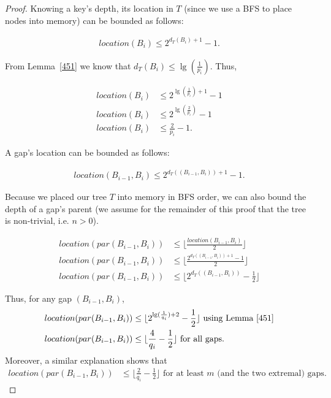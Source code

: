 \documentclass[letterpaper,12pt,titlepage,oneside,final]{book}
\theoremstyle{plain}
\begin{document}
\begin{proof}
Knowing a key's depth, its location in $T$ (since we use a BFS to place nodes into memory) can be bounded as follows:

\begin{align*}
location(B_i) \leq 2^{d_T(B_i)+1}-1.
\end{align*}

From Lemma~\ref{451} we know that $d_T(B_i) \leq \lg(\frac{1}{p_i})$. Thus,

\begin{align*}
location(B_i) &\leq 2^{\lg(\frac{1}{p_i})+1}-1 \\
location(B_i) &\leq 2^{\lg(\frac{2}{p_i})}-1 \\
location(B_i) &\leq \frac{2}{p_i}-1.
\end{align*}

A gap's location can be bounded as follows:

\begin{align*}
location(B_{i-1}, B_i) \leq 2^{d_T((B_{i-1},B_i))+1}-1.
\end{align*}

Because we placed our tree $T$ into memory in BFS order, we can also bound the depth of a gap's parent (we assume for the remainder of this proof that the tree is non-trivial, i.e. $n>0$).

\begin{align*}
location(par(B_{i-1}, B_i)) &\leq \lfloor \frac{location(B_{i-1}, B_i)}{2} \rfloor \\
location(par(B_{i-1}, B_i)) &\leq \lfloor \frac{2^{d_T((B_{i-1},B_i))+1}-1}{2} \rfloor \\
location(par(B_{i-1}, B_i)) &\leq \lfloor 2^{d_T((B_{i-1},B_i))}-\frac{1}{2} \rfloor
\end{align*}

Thus, for any gap $(B_{i-1},B_i)$,
\begin{align*}
location(par(B_{i-1},B_i)) &\leq \lfloor 2^{\lg(\frac{1}{q_i}) + 2}-\frac{1}{2} \rfloor \text{ using Lemma~\ref{451}} \\
location(par(B_{i-1},B_i)) &\leq \lfloor \frac{4}{q_i}-\frac{1}{2} \rfloor \text{ for all gaps.}
\end{align*}
Moreover, a similar explanation shows that 
\begin{align*}
location(par(B_{i-1},B_i)) &\leq \lfloor \frac{2}{q_i}-\frac{1}{2} \rfloor \text{ for at least $m$ (and the two extremal) gaps.}
\end{align*}

\end{proof}
\end{document}
